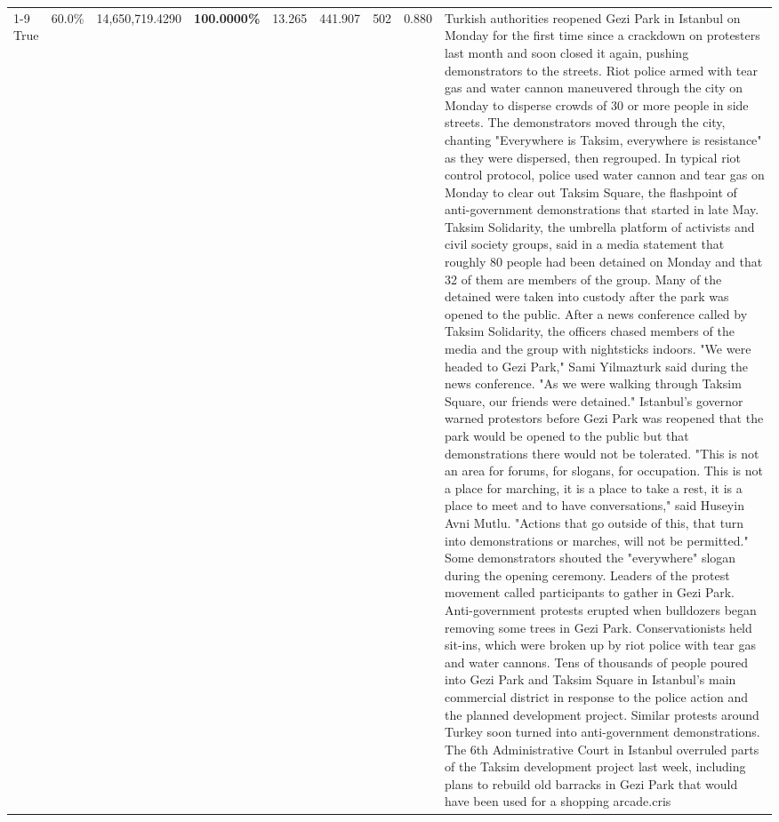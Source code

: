 \begin{table}[H]
\begin{tabular}{lllrlllll}
\cline{1-9}
True & 60.0\% & 14,650,719.4290 & \bfseries \color{red} 100.0000\% & 13.265 & 441.907 & 502 & 0.880 & Turkish authorities reopened Gezi Park in Istanbul on Monday for the first time since a crackdown on protesters last month and soon closed it again, pushing demonstrators to the streets. Riot police armed with tear gas and water cannon maneuvered through the city on Monday to disperse crowds of 30 or more people in side streets. The demonstrators moved through the city, chanting "Everywhere is Taksim, everywhere is resistance" as they were dispersed, then regrouped. In typical riot control protocol, police used water cannon and tear gas on Monday to clear out Taksim Square, the flashpoint of anti-government demonstrations that started in late May. Taksim Solidarity, the umbrella platform of activists and civil society groups, said in a media statement that roughly 80 people had been detained on Monday and that 32 of them are members of the group. Many of the detained were taken into custody after the park was opened to the public. After a news conference called by Taksim Solidarity, the officers chased members of the media and the group with nightsticks indoors. "We were headed to Gezi Park," Sami Yilmazturk said during the news conference. "As we were walking through Taksim Square, our friends were detained." Istanbul's governor warned protestors before Gezi Park was reopened that the park would be opened to the public but that demonstrations there would not be tolerated. "This is not an area for forums, for slogans, for occupation. This is not a place for marching, it is a place to take a rest, it is a place to meet and to have conversations," said Huseyin Avni Mutlu. "Actions that go outside of this, that turn into demonstrations or marches, will not be permitted." Some demonstrators shouted the "everywhere" slogan during the opening ceremony. Leaders of the protest movement called participants to gather in Gezi Park. Anti-government protests erupted when bulldozers began removing some trees in Gezi Park. Conservationists held sit-ins, which were broken up by riot police with tear gas and water cannons. Tens of thousands of people poured into Gezi Park and Taksim Square in Istanbul's main commercial district in response to the police action and the planned development project. Similar protests around Turkey soon turned into anti-government demonstrations. The 6th Administrative Court in Istanbul overruled parts of the Taksim development project last week, including plans to rebuild old barracks in Gezi Park that would have been used for a shopping arcade.cris \\

\end{tabular}
\end{table}
